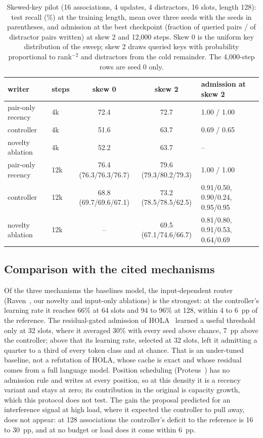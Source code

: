 \documentclass[conference]{IEEEtran}
\begin{document}
\begin{table}[t]
\caption{Skewed-key pilot (16 associations, 4 updates, 4 distractors, 16
slots, length 128): test recall
(\%) at the training length, mean over three seeds with the seeds in
parentheses, and admission at the best checkpoint (fraction of queried pairs /
of distractor pairs written) at skew 2 and 12{,}000 steps. Skew 0 is the
uniform key distribution of the sweep; skew 2 draws queried keys with
probability proportional to rank$^{-2}$ and distractors from the cold
remainder. The 4{,}000-step rows are seed 0 only.}
\label{tab:skew}
\centering
\scriptsize
\setlength{\tabcolsep}{2.5pt}
\begin{tabular}{@{}llccp{}@{}}
\toprule
writer & steps & skew 0 & skew 2 & admission at skew 2 \\
\midrule
pair-only recency & 4k & 72.4 & 72.7 & 1.00 / 1.00 \\
controller & 4k & 51.6 & 63.7 & 0.69 / 0.65 \\
novelty ablation & 4k & 52.2 & 63.7 & -- \\
\midrule
pair-only recency & 12k & 76.4 {\tiny(76.3/76.3/76.7)} & 79.6 {\tiny(79.3/80.2/79.3)} & 1.00 / 1.00 \\
controller & 12k & 68.8 {\tiny(69.7/69.6/67.1)} & 73.2 {\tiny(78.5/78.5/62.5)} & 0.91/0.50, 0.90/0.24, 0.95/0.95 \\
novelty ablation & 12k & -- & 69.5 {\tiny(67.1/74.6/66.7)} & 0.81/0.80, 0.91/0.53, 0.64/0.69 \\
\bottomrule
\end{tabular}
\end{table}

\subsection{Comparison with the cited mechanisms}

Of the three mechanisms the baselines model, the input-dependent router
(Raven~\cite{afzal2026raven}, our novelty and input-only ablations) is the
strongest: at the controller's learning rate it reaches 66\% at 64 slots and
94 to 96\% at 128, within 4 to 6~pp of the reference. The residual-gated admission
of HOLA~\cite{cui2026hola} learned a useful threshold only at 32 slots, where
it averaged 30\% with every seed above chance, 7~pp above the controller; above that its
learning rate, selected at 32 slots, left it admitting a quarter to a third of
every token class and at chance. That is an under-tuned baseline, not a
refutation of HOLA, whose cache is exact and whose residual comes from a full
language model. Position scheduling (Proteus~\cite{bayat2026proteus}) has no
admission rule and writes at every position, so at this density it is a
recency variant and stays at zero; its contribution in the original is
capacity growth, which this protocol does not test. The gain the proposal
predicted for an interference signal at high load, where it expected the
controller to pull away, does not appear: at 128
associations the controller's deficit to the reference is 16 to 30~pp, and at
no budget or load does it come within 6~pp.
\end{document}
